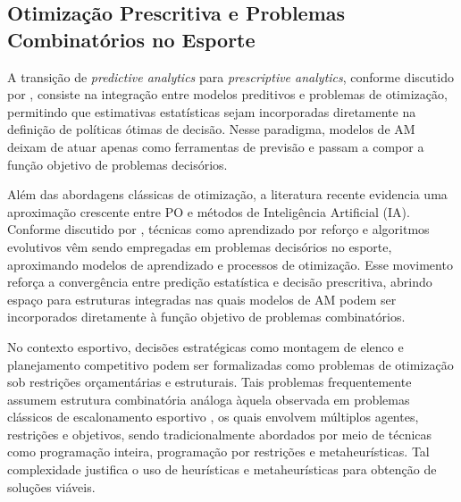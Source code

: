 \subsection{Otimização Prescritiva e Problemas Combinatórios no Esporte}

A transição de \textit{predictive analytics} para \textit{prescriptive analytics}, conforme discutido por \cite{Bertsimas2019}, 
consiste na integração entre modelos preditivos e problemas de otimização, permitindo que estimativas estatísticas sejam incorporadas 
diretamente na definição de políticas ótimas de decisão. Nesse paradigma, modelos de AM deixam de atuar apenas como ferramentas de previsão e 
passam a compor a função objetivo de problemas decisórios.

Além das abordagens clássicas de otimização, a literatura recente evidencia uma aproximação crescente entre PO e métodos de Inteligência Artificial (IA). 
Conforme discutido por \cite{Chmait2021}, técnicas como aprendizado por reforço e algoritmos evolutivos vêm sendo empregadas em problemas decisórios 
no esporte, aproximando modelos de aprendizado e processos de otimização. Esse movimento reforça a convergência entre predição estatística e decisão prescritiva, 
abrindo espaço para estruturas integradas nas quais modelos de AM podem ser incorporados diretamente à função objetivo de problemas combinatórios.

No contexto esportivo, decisões estratégicas como montagem de elenco e planejamento competitivo podem ser formalizadas como problemas de otimização 
sob restrições orçamentárias e estruturais. Tais problemas frequentemente assumem estrutura combinatória análoga àquela observada em problemas clássicos 
de escalonamento esportivo \cite{Kendall2010,Kendall2010b}, os quais envolvem múltiplos agentes, restrições e objetivos, sendo tradicionalmente abordados 
por meio de técnicas como programação inteira, programação por restrições e metaheurísticas. Tal complexidade justifica o uso de heurísticas e metaheurísticas 
para obtenção de soluções viáveis.

